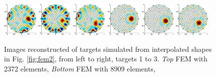 \documentclass[letterpaper,twocolumn,10pt]{article}
\begin{document}
\begin{figure}[tbh]
\begin{center}
 \includegraphics[width= 0.15\textwidth]{figs/fig4a-2372e.png}
 \includegraphics[width= 0.15\textwidth]{figs/fig4b-2372e.png}
 \includegraphics[width= 0.15\textwidth]{figs/fig4c-2372e.png}
 \includegraphics[width= 0.15\textwidth]{figs/fig4a-8909e.png}
 \includegraphics[width= 0.15\textwidth]{figs/fig4b-8909e.png}
 \includegraphics[width= 0.15\textwidth]{figs/fig4c-8909e.png}
\caption{ \label{fig:fem2_images}
\small
Images reconstructed of targets simulated from
interpolated shapes in Fig. \ref{fig:fem2}, from
left to right, targets 1 to 3.
{\em Top} FEM with 2372 elements,
{\em Bottom} FEM with 8909 elements,
}
\end{center}
\vspace{-0.5cm}
\end{figure}
\end{document}
